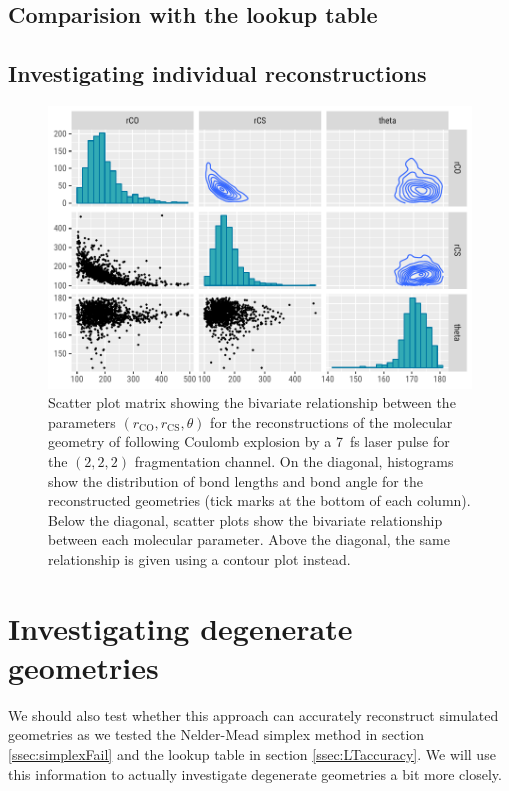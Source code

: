 \subsection{Comparision with the lookup table}


\subsection{Investigating individual reconstructions}


\begin{figure}
  \centering
  \includegraphics[width=\textwidth]{Plots/OCS2227fsMOGeometryPairs}
  \caption[Scatter plot matrix showing the bivariate relationship between the parameters $(r_\mathrm{CO}, r_\mathrm{CS}, \theta)$ for the reconstructions of the molecular geometry of  following Coulomb explosion by a \SI{7}{\fs} laser pulse for the $(2,2,2)$ fragmentation channel.]
  {Scatter plot matrix showing the bivariate relationship between the parameters $(r_\mathrm{CO}, r_\mathrm{CS}, \theta)$ for the reconstructions of the molecular geometry of  following Coulomb explosion by a \SI{7}{\fs} laser pulse for the $(2,2,2)$ fragmentation channel. On the diagonal, histograms show the distribution of bond lengths and bond angle for the reconstructed geometries (tick marks at the bottom of each column). Below the diagonal, scatter plots show the bivariate relationship between each molecular parameter. Above the diagonal, the same relationship is given using a contour plot instead.}
  \label{fig:OCS2227fsMOGeometryPairs}
\end{figure}

\section{Investigating degenerate geometries}
We should also test whether this approach can accurately reconstruct simulated geometries as we tested the Nelder-Mead simplex method in section \ref{ssec:simplexFail} and the lookup table in section \ref{ssec:LTaccuracy}. We will use this information to actually investigate degenerate geometries a bit more closely.

